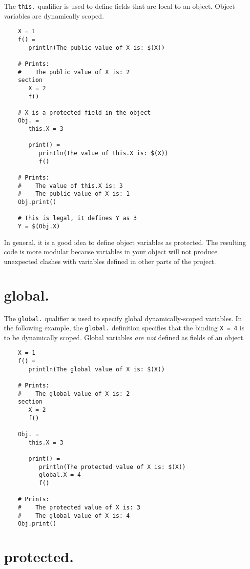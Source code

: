 The \verb+this.+ qualifier is used to define fields that are local to an object.
Object variables are dynamically scoped.

\begin{verbatim}
    X = 1
    f() =
       println(The public value of X is: $(X))

    # Prints:
    #    The public value of X is: 2
    section
       X = 2
       f()

    # X is a protected field in the object
    Obj. =
       this.X = 3

       print() =
          println(The value of this.X is: $(X))
          f()

    # Prints:
    #    The value of this.X is: 3
    #    The public value of X is: 1
    Obj.print()

    # This is legal, it defines Y as 3
    Y = $(Obj.X)
\end{verbatim}

In general, it is a good idea to define object variables as protected.  The resulting code is more
modular because variables in your object will not produce unexpected clashes with variables defined
in other parts of the project.

\section{global.}
\label{section:global}

The \verb+global.+ qualifier is used to specify global dynamically-scoped variables.  In the following
example, the \verb+global.+ definition specifies that the binding \verb+X = 4+ is to be dynamically
scoped.  Global variables \emph{are not} defined as fields of an object.

\begin{verbatim}
    X = 1
    f() =
       println(The global value of X is: $(X))

    # Prints:
    #    The global value of X is: 2
    section
       X = 2
       f()

    Obj. =
       this.X = 3

       print() =
          println(The protected value of X is: $(X))
          global.X = 4
          f()

    # Prints:
    #    The protected value of X is: 3
    #    The global value of X is: 4
    Obj.print()
\end{verbatim}

\section{protected.}
\label{section:protected}

